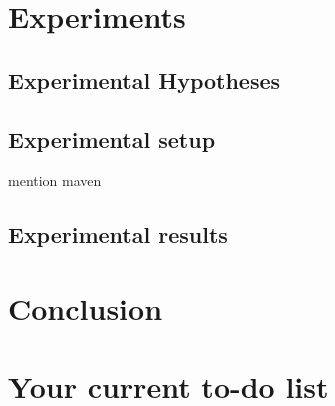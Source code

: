\documentclass[11pt,letterpaper]{article}
\newcommand{\blue}[1]{\textcolor{RoyalBlue}{#1}}
\newcommand{\instructions}[1]{\blue{\textit{#1}}}
\begin{document}
\section{Experiments}
\label{sec:experiments}

\subsection{Experimental Hypotheses}
\label{sec:exper-hypoth}

\subsection{Experimental setup}
\label{sec:experimental-setup}
mention maven

\subsection{Experimental results}
\label{sec:experimental-results}

\section{Conclusion}

\section*{Your current to-do list}
\end{document}
